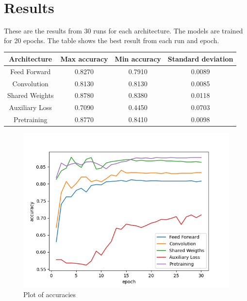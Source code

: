 \documentclass[12pt]{article}
\begin{document}
\section{Results}
These are the results from 30 runs for each architecture.
The models are trained for 20 epochs.
The table shows the best result from each run and epoch.
\begin{center}
\begin{tabular}{| c | c | c | c |} 
 \hline
 Architecture & Max accuracy & Min accuracy & Standard deviation \\ [0.5ex] 
 \hline\hline
  Feed Forward & 0.8270 & 0.7910 & 0.0089  \\ 
 \hline
 Convolution & 0.8130 & 0.8130 & 0.0085 \\
 \hline
 Shared Weights & 0.8780 & 0.8380 & 0.0118 \\
 \hline
 Auxiliary Loss & 0.7090 & 0.4450 & 0.0703 \\
 \hline
 Pretraining & 0.8770 & 0.8410 & 0.0098 \\ [1ex] 
 \hline
\end{tabular}
\end{center}
\begin{figure}[h]
\centering
\includegraphics[width=\textwidth]{"accs.png"}
\caption{Plot of accuracies}
\end{figure}
\end{document}
